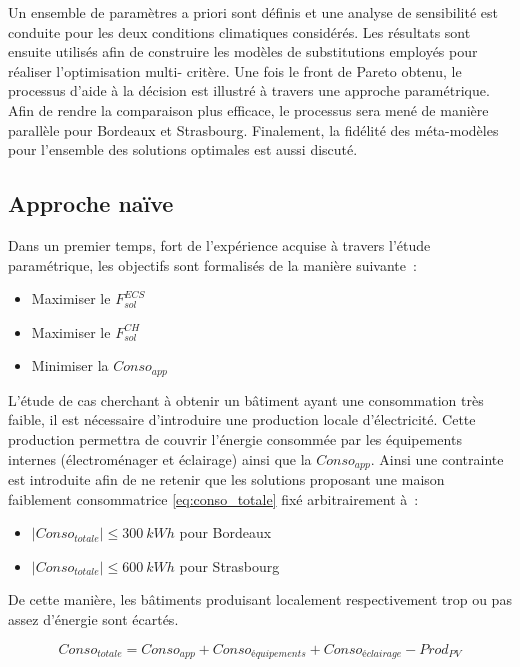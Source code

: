 Un ensemble de paramètres a priori sont définis et une analyse de sensibilité est conduite
pour les deux conditions climatiques considérés. Les résultats sont ensuite utilisés afin
de construire les modèles de substitutions employés pour réaliser l’optimisation multi-
critère. Une fois le front de Pareto obtenu, le processus d’aide à la décision est
illustré à travers une approche paramétrique. Afin de rendre la comparaison plus efficace,
le processus sera mené de manière parallèle pour Bordeaux et Strasbourg. Finalement, la
fidélité des méta-modèles pour l’ensemble des solutions optimales est aussi discuté.



\subsection{Approche naïve} %
\label{sub:approche_naive}
\noindent Dans un premier temps, fort de l’expérience acquise à travers l’étude paramétrique,
les objectifs sont formalisés de la manière suivante~:
\begin{itemize}
  \item Maximiser le $F_{sol}^{ECS}$
  \item Maximiser le $F_{sol}^{CH}$
  \item Minimiser la $Conso_{app}$
\end{itemize}
L’étude de cas cherchant à obtenir un bâtiment ayant une consommation très faible, il est
nécessaire d’introduire une production locale d’électricité. Cette production permettra de
couvrir l’énergie consommée par les équipements internes (électroménager et éclairage)
ainsi que la $Conso_{app}$. Ainsi une contrainte est introduite afin de ne retenir que
les solutions proposant une maison faiblement consommatrice \eqref{eq:conso_totale} fixé arbitrairement à~:
\begin{itemize}
   \item $|Conso_{totale}| \leq \SI{300}{kWh}$ pour Bordeaux
   \item $|Conso_{totale}| \leq \SI{600}{kWh}$ pour Strasbourg
 \end{itemize}
De cette manière, les bâtiments produisant localement respectivement trop ou pas assez d’énergie sont
écartés.

\begin{equation} \label{eq:conso_totale}
  Conso_{totale} = Conso_{app} + Conso_{équipements} + Conso_{éclairage} - Prod_{PV}
\end{equation}

